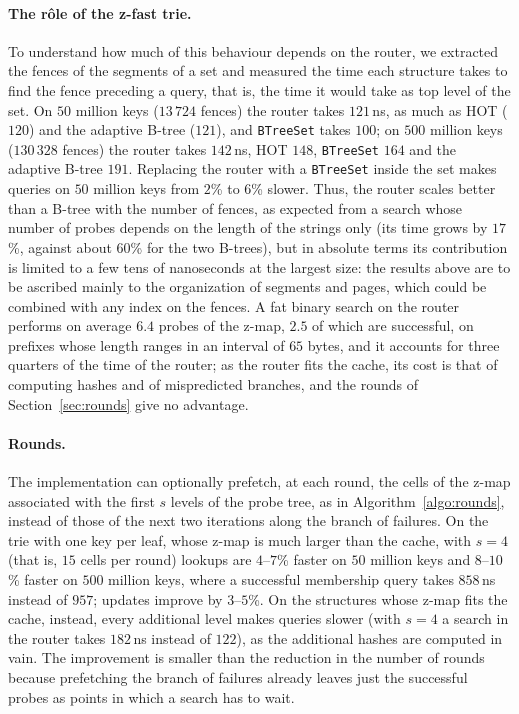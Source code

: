 \documentclass[a4paper]{article}
\newcommand{\?}{\mskip1.5mu}
\begin{document}
\paragraph{The r\^ole of the z-fast trie.} To understand how much of this behaviour depends on the router, we extracted the fences of the segments 
of a set and measured the time each structure takes to find the fence preceding a query, that is, the time it would take as top level of the set. 
On $50$ million keys ($13\,724$ fences) the router takes $121$\,ns, as much as HOT ($120$) and the adaptive B-tree ($121$), 
and \texttt{BTreeSet} takes $100$; on $500$ million keys ($130\,328$ fences) the router takes $142$\,ns, HOT $148$, \texttt{BTreeSet} $164$ and the adaptive B-tree $191$. 
Replacing the router with a \texttt{BTreeSet} inside the set makes queries on $50$ million keys from $2$\% to $6$\% slower. 
Thus, the router scales better than a B-tree with the number of fences, as expected from a search whose number of probes depends on the length of the strings only 
(its time grows by $17$\%, against about $60$\% for the two B-trees), but in absolute terms its contribution is limited to a few tens of nanoseconds at the largest size: 
the results above are to be ascribed mainly to the organization of segments and pages, which could be combined with any index on the fences. 
A fat binary search on the router performs on average $6.4$ probes of the z-map, $2.5$ of which are successful, on prefixes whose length ranges in an interval of $65$ bytes, 
and it accounts for three quarters of the time of the router; as the router fits the cache, its cost is that of computing hashes and of mispredicted branches, 
and the rounds of Section~\ref{sec:rounds} give no advantage.

\paragraph{Rounds.} The implementation can optionally prefetch, at each round, the cells of the z-map associated with the first $s$ levels of the probe tree, 
as in Algorithm~\ref{algo:rounds}, instead of those of the next two iterations along the branch of failures. 
On the trie with one key per leaf, whose z-map is much larger than the cache, with $s=4$ (that is, $15$ cells per round)
lookups are $4$--$7$\% faster on $50$ million keys and $8$--$10$\% faster on $500$ million keys, where a successful membership query takes $858$\,ns instead of $957$; 
updates improve by $3$--$5$\%. On the structures whose z-map fits the cache, instead, every additional level makes queries slower 
(with $s=4$ a search in the router takes $182$\,ns instead of $122$), as the additional hashes are computed in vain. 
The improvement is smaller than the reduction in the number of rounds because prefetching the branch of failures 
already leaves just the successful probes as points in which a search has to wait.
\end{document}

